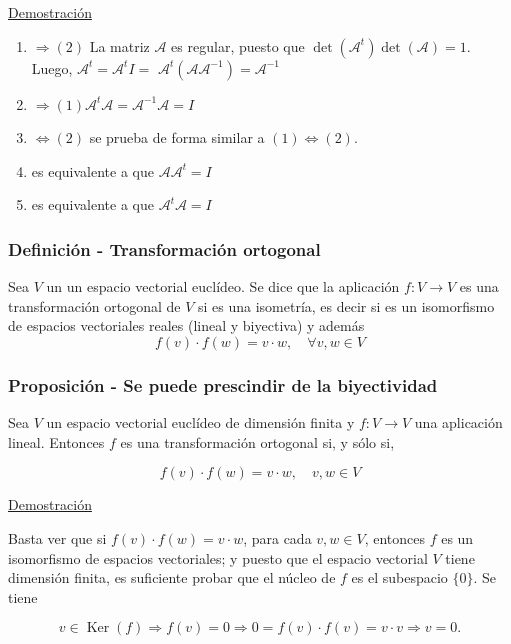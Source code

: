 \documentclass[12pt, a4paper, ones, notitlepage, openany,titlepage]{article}
\newcommand{\demostracion}{\noindent\underline{Demostración}}
\begin{document}
\demostracion
\begin{enumerate}[label=(\arabic*)]
	\item $\Rightarrow(2)$ La matriz $\mathcal{A}$ es regular, puesto que $\det\left(\mathcal{A}^{t}\right) \det(\mathcal{A})=1$. Luego, $\mathcal{A}^{t}=\mathcal{A}^{t} I=$ $\mathcal{A}^{t}\left(\mathcal{A} \mathcal{A}^{-1}\right)=\mathcal{A}^{-1}$
	
	\item $\Rightarrow(1) \mathcal{A}^{t} \mathcal{A}=\mathcal{A}^{-1} \mathcal{A}=I$
	
	\item $\Leftrightarrow(2)$ se prueba de forma similar a $(1) \Leftrightarrow(2)$.
	
	\item es equivalente a que $\mathcal{A} \mathcal{A}^{t}=I$
	
	\item es equivalente a que $\mathcal{A}^{t} \mathcal{A}=I$ 
\end{enumerate}

\subsubsection{Definición - Transformación ortogonal}
Sea $V$ un un espacio vectorial euclídeo. Se dice que la aplicación $f: V \rightarrow V$ es una transformación ortogonal de $V$ si es una isometría, es decir si es un isomorfismo de espacios vectoriales reales (lineal y biyectiva) y además
$$
f(v) \cdot f(w)=v \cdot w, \quad \forall v, w \in V
$$

\subsubsection{Proposición - Se puede prescindir de la biyectividad}
Sea $V$ un espacio vectorial euclídeo de dimensión finita y $f: V \rightarrow V$ una aplicación lineal. Entonces $f$ es una transformación ortogonal si, y sólo si,

$$
f(v) \cdot f(w)=v \cdot w, \quad v, w \in V
$$

\demostracion

Basta ver que si $f(v) \cdot f(w)=v \cdot w$, para cada $v, w \in V$, entonces $f$ es un isomorfismo de espacios vectoriales; y puesto que el espacio vectorial $V$ tiene dimensión finita, es suficiente probar que el núcleo de $f$ es el subespacio $\{0\}$. Se tiene

$$
v \in \operatorname{Ker}(f) \Longrightarrow f(v)=0 \Longrightarrow 0=f(v) \cdot f(v)=v \cdot v \Longrightarrow v=0 .
$$
\end{document}
